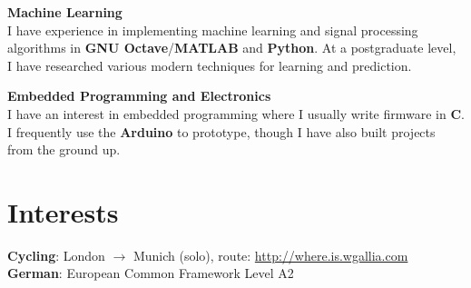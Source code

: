 \documentclass[margin,line,a4paper]{resume}
\begin{document}
\begin{resume}
\textbf{Machine Learning} \vspace{1mm} \\
I have experience in implementing machine learning and signal processing algorithms in \textbf{GNU Octave}/\textbf{MATLAB} and \textbf{Python}. At a postgraduate level, I have researched various modern techniques for learning and prediction.

\textbf{Embedded Programming and Electronics} \vspace{1mm} \\
I have an interest in embedded programming where I usually write firmware in \textbf{C}. I
frequently use the \textbf{Arduino} to prototype, though I have also built projects from the ground up.

\section{\mysidestyle Interests}

\textbf{Cycling}: London $\rightarrow$ Munich (solo), route: \href{http://where.is.wgallia.com}{http://where.is.wgallia.com} \vspace{1mm} \\
\textbf{German}: European Common Framework Level A2




\end{resume}
\end{document}
